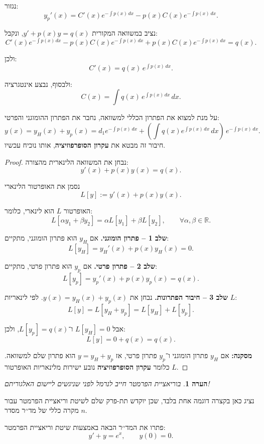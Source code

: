 \documentclass{article}
\numberwithin{equation}{section}
\newcounter{example}[section]
\newtheorem{remark}{הערה}[section]
\begin{document}
נגזור:
\[
y_p'(x) = C'(x)e^{-\int p(x)\,dx} - p(x)C(x)e^{-\int p(x)\,dx}.
\]

נציב במשוואה המקורית $y' + p(x)y = q(x)$, ונקבל:
\[
C'(x)e^{-\int p(x)\,dx}- p(x)C(x)e^{-\int p(x)\,dx}+p(x)C(x)e^{-\int p(x)\,dx} = q(x).
\]

ולכן:
\[
C'(x) = q(x)\,e^{\int p(x)\,dx}.
\]

ולבסוף, נבצע אינטגרציה:
\begin{equation}
\boxed{C(x) = \int q(x)\,e^{\int p(x)\,dx}\,dx}.
\end{equation}

על מנת למצוא את הפתרון הכללי למשוואה, נחבר את הפתרון ההומוגני והפרטי:
\begin{equation}
\boxed{y(x) = y_H(x) + y_p(x) 
= d_1 e^{-\int p(x)\,dx} + \left(\int q(x)e^{\int p(x)\,dx}\,dx\right)\,e^{-\int p(x)\,dx}}.
\end{equation}
חיבור זה מבטא את \textbf{עקרון הסופרפוזיציה}, אותו נוכיח עכשיו.

\begin{proof}
נבחן את המשוואה הלינארית מהצורה:
\[
y'(x) + p(x)y(x) = q(x).
\]

נסמן את האופרטור הלינארי
\[
L[y] := y'(x) + p(x)y(x).
\]

האופרטור $L$ הוא לינארי, כלומר:
\[
L[\alpha y_1 + \beta y_2] = \alpha L[y_1] + \beta L[y_2], \qquad \forall \alpha,\beta \in \mathbb{R}.
\]

\textbf{שלב 1 – פתרון הומוגני.}  
אם $y_H$ הוא פתרון הומוגני, מתקיים:
\[
L[y_H] = y_H'(x) + p(x)y_H(x) = 0.
\]

\textbf{שלב 2 – פתרון פרטי.}  
אם $y_p$ הוא פתרון פרטי, מתקיים:
\[
L[y_p] = y_p'(x) + p(x)y_p(x) = q(x).
\]

\textbf{שלב 3 – חיבור הפתרונות.}  
נבחן את $y(x) = y_H(x) + y_p(x)$.  
לפי לינאריות $L$:
\[
L[y] = L[y_H + y_p] = L[y_H] + L[y_p].
\]

אבל $L[y_H]=0$ ו־$L[y_p]=q(x)$, ולכן:
\[
L[y] = 0 + q(x) = q(x).
\]

\textbf{מסקנה:}  
אם $y_H$ פתרון הומוגני ו־$y_p$ פתרון פרטי, אז $y = y_H + y_p$ הוא פתרון שלם למשוואה.  
כלומר \textbf{עקרון הסופרפוזיציה} נובע ישירות מלינאריות האופרטור $L$.
\end{proof}

\begin{remark}
בוריאציית הפרמטר חייב לנרמל לפני שניגשים ליישום האלגוריתם!
\end{remark}
נציג כאן בקצרה דוגמה אחת בלבד, שכן יוקדש תת-פרק שלם לשיטת וריאציית הפרמטר עבור מקרה כללי של מד׳׳ר מסדר $n$. 
\begin{example}

פתרו את המד׳׳ר הבאה באמצעות שיטת וריאציית הפרמטר:
\[
y' + y = e^x, \qquad y(0)=0.
\]

\end{example}
\end{document}
